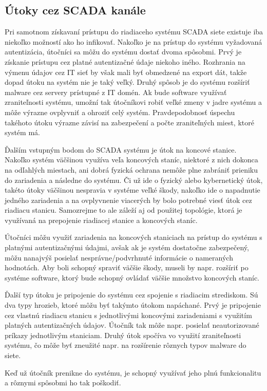 \subsection{Útoky cez SCADA kanále}
\tab Pri samotnom získavaní prístupu do riadiaceho systému SCADA siete existuje iba niekoľko možností ako ho infikovať. Nakoľko je na prístup do systému vyžadovaná autentizácia, útočníci sa môžu do systému dostať dvoma spôsobmi. Prvý je získanie prístupu cez platné autentizačné údaje niekoho iného. Rozhrania na výmenu údajov cez IT sieť by však mali byť obmedzené na export dát, takže dopad útoku na systém nie je taký veľký. Druhý spôsob je do systému rozšíriť malware cez servery prístupné z IT domén. Ak bude software využívať zraniteľnosti systému, umožní tak útočníkovi robiť veľké zmeny v jadre systému a môže výrazne ovplyvniť a ohroziť celý systém. Pravdepodobnosť úspechu takéhoto útoku výrazne závisí na zabezpečení a počte zraniteľných miest, ktoré systém má. \par
Ďalším vstupným bodom do SCADA systému je útok na koncové stanice. Nakoľko systém väčšinou využíva veľa koncových staníc, niektoré z nich dokonca na odľahlých miestach, ani dobrá fyzická ochrana nemôže plne zabrániť prieniku do zariadenia a následne do systému. Či už ide o fyzický alebo kybernetický útok, takéto útoky väčšinou nespravia v systéme veľké škody, nakoľko ide o napadnutie jedného zariadenia a na ovplyvnenie viacerých by bolo potrebné viesť útok cez riadiacu stanicu. Samozrejme to ale záleží aj od použitej topológie, ktorá je využívaná na prepojenie riadiacej stanice a koncových staníc. \par
Útočníci môžu využiť zariadenia na koncových staniciach na prístup do systému s platnými autentizačnými údajmi, avšak ak je systém dostatočne zabezpečený, môžu nanajvýš posielať nesprávne/podvrhnuté informácie o nameraných hodnotách. Aby boli schopný spraviť väčšie škody, museli by napr. rozšíriť po systéme software, ktorý bude schopný ovládať väčšie množstvo koncových staníc. \par
Ďalší typ útoku je pripojenie do systému cez spojenie s riadiacim strediskom. Sú dva typy hrozieb, ktoré môžu byť takýmto útokom napáchané. Prvý je pripojenie cez vlastnú riadiacu stanicu s jednotlivými koncovými zariadeniami s využitím platných autentizačných údajov. Útočník tak môže napr. posielať neautorizované príkazy jednotlivým staniciam. Druhý útok spočíva vo využití zraniteľnosti systému, čo môže byť zneužité napr. na rozšírenie rôznych typov malware do siete. \par
Keď už útočník prenikne do systému, je schopný využívať jeho plnú funkcionalitu a rôznymi spôsobmi ho tak poškodiť\cite{Security}.

